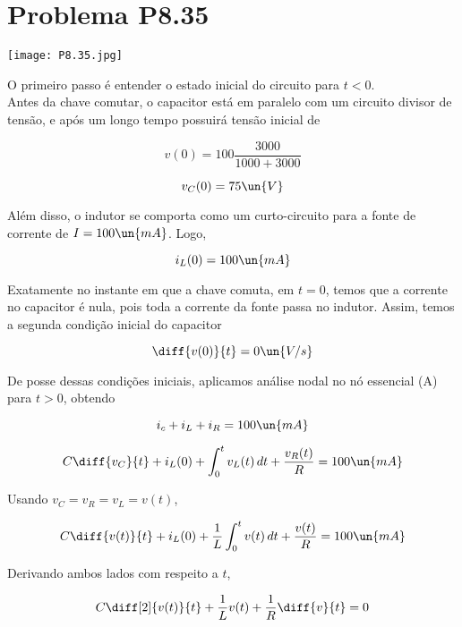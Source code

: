 
\section*{Problema P8.35}

\renewcommand*\thesection{8.35}

\begin{center}
    \texttt{[image: P8.35.jpg]}
\end{center}

O primeiro passo é entender o estado inicial do circuito para $t<0$. \\
Antes da chave comutar, o capacitor está em paralelo com um circuito divisor de tensão, e após um longo tempo possuirá tensão
inicial de 

\[ v(0) = 100\frac{3000}{1000 + 3000} \]

\begin{equation}\label{eq:8.35.1}
    v_C(0) = 75 \un{V}
\end{equation}

Além disso, o indutor se comporta como um curto-circuito para a fonte de corrente de $I = 100 \un{mA}$. Logo,  

\begin{equation}\label{eq:8.35.2}
    i_L(0) = 100 \un{mA}
\end{equation}

Exatamente no instante em que a chave comuta, em $t = 0$, temos que a corrente no capacitor é nula, pois toda a corrente
da fonte passa no indutor. Assim, temos a segunda condição inicial do capacitor 

\begin{equation}\label{eq:8.35.3}
    \diff{v(0)}{t} = 0 \un{V/s}
\end{equation}

De posse dessas condições iniciais, aplicamos análise nodal no nó essencial (A) para $t>0$, obtendo  

\[ i_c + i_L + i_R = 100 \un{mA}  \]

\[ C\diff{v_C}{t} + i_L(0) + \int_{0}^{t}v_L(t) \, dt + \frac{v_R(t)}{R} = 100 \un{mA}  \]

Usando $v_C = v_R = v_L = v(t)$,

\[ C\diff{v(t)}{t} + i_L(0) + \frac{1}{L} \int_{0}^{t}v(t) \, dt + \frac{v(t)}{R} = 100 \un{mA}  \]

Derivando ambos lados com respeito a $t$,

\[ C\diff[2]{v(t)}{t} + \frac{1}{L} v(t) + \frac{1}{R} \diff{v}{t} = 0  \]

